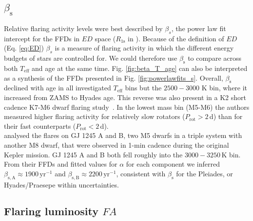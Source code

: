 \documentclass{aa}
\begin{document}
\subsection{$\beta_\mathrm{s}$}
Relative flaring activity levels were best described by $\beta_s$, the power law fit intercept for the FFDs in $ED$ space  ($R_\mathrm{1s}$ in \citealt{davenport2019}). Because of the definition of $ED$ (Eq. \ref{eq:ED}) $\beta_s$ is a measure of flaring activity in which the different energy budgets of stars are controlled for. We could therefore use $\beta_\mathrm{s}$ to compare across both $T_\mathrm{eff}$ and age at the same time. Fig. \ref{fig:beta_T_age} can also be interpreted as a synthesis of the FFDs presented in Fig. \ref{fig:powerlawfits_s}. Overall, $\beta_\mathrm{s}$ declined with age in all investigated $T_\mathrm{eff}$ bins but the $2500-3000$ K bin, where it increased from ZAMS to Hyades age. This reverse was also present in a K2 short cadence K7-M6 dwarf flaring study~\citep{raetz2020}. In the lowest mass bin (M5-M6) the authors measured higher flaring activity for relatively slow rotators ($P_\mathrm{rot} > 2\,$d) than for their fast counterparts ($P_\mathrm{rot} < 2\,$d).  
\\
\citet{lurie2015} analysed the flares on GJ 1245 A and B, two M5 dwarfs in a triple system with another M8 dwarf, that were observed in 1-min cadence during the original Kepler mission. GJ 1245 A and B both fell roughly into the $3000-3250\,$K bin. From their FFDs and fitted values for $\alpha$ for each component we inferred $\beta_\mathrm{s,A}\approx 1900\,\mathrm{yr}^{-1}$  and $\beta_\mathrm{s,B}\approx 2200\,\mathrm{yr}^{-1}$, consistent with $\beta_\mathrm{s}$ for the Pleiades, or Hyades/Praesepe within uncertainties.
\subsection{Flaring luminosity $FA$}
\end{document}
